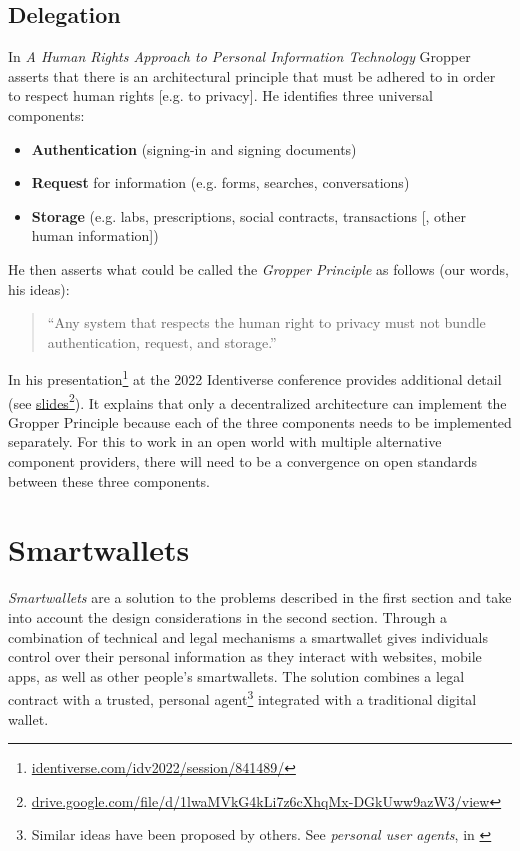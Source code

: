 \documentclass[11pt, oneside]{article}   	%
\newcommand{\hyperfootnote}[1][]{\def\ArgI{{#1}}\hyperfootnoteRelay}
\newcommand\hyperfootnoteRelay[2][]{\href{#1#2}{\ArgI}\footnote{\href{#1#2}{#2}}}
\begin{document}
\subsection{Delegation}

In \emph{A Human Rights Approach to Personal Information Technology}\cite{Gropper2022} Gropper asserts that there is an architectural principle that must be adhered to in order to respect human rights [e.g. to privacy]. He identifies three universal components:

\begin{itemize}
\item \textbf{Authentication} (signing-in and signing documents)
\item \textbf{Request} for information (e.g. forms, searches, conversations)
\item \textbf{Storage} (e.g. labs, prescriptions, social contracts, transactions [, other human information])
\end{itemize}

He then asserts what could be called the \emph{Gropper Principle} as follows (our words, his ideas):
\begin{quote}
``Any system that respects the human right to privacy must not bundle authentication, request, and storage.''
\end{quote}

In his presentation\hyperfootnote[][https://]{identiverse.com/idv2022/session/841489/} at the 2022 Identiverse conference provides additional detail (see \hyperfootnote[slides][https://]{drive.google.com/file/d/1lwaMVkG4kLi7z6cXhqMx-DGkUww9azW3/view}). It explains that only a decentralized architecture can implement the Gropper Principle because each of the three components needs to be implemented separately. For this to work in an open world with multiple alternative component providers, there will need to be a convergence on open standards between these three components. 

\section{Smartwallets} %

 \emph{Smartwallets} are a solution to the problems described in the first section and take into account the design considerations in the second section. Through a combination of technical and legal mechanisms a smartwallet gives individuals control over their personal information as they interact with websites, mobile apps, as well as other people's smartwallets. The solution combines a legal contract with a trusted, personal agent\footnote{Similar ideas have been proposed by others. See \emph{personal user agents}, in \cite[p24]{Flanagan2020}} integrated with a traditional digital wallet\cite{Graham2023}. 
\end{document}
